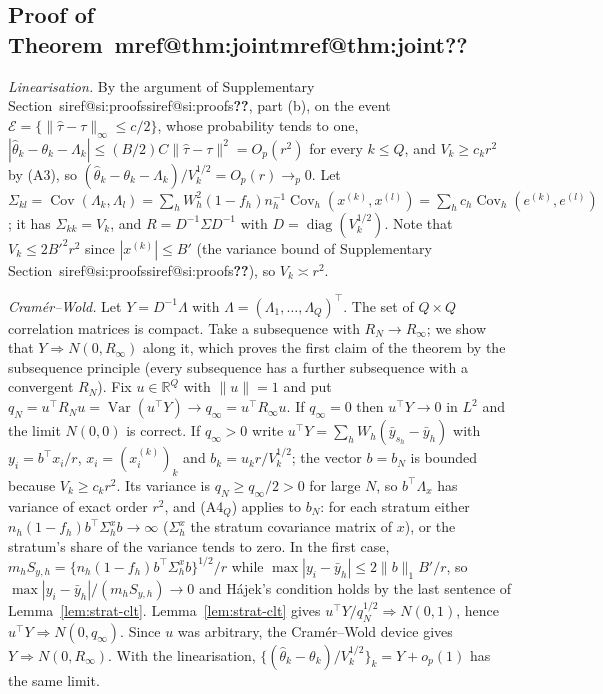 \documentclass[pdflatex,sn-mathphys-num,iicol]{sn-jnl}
\makeatletter
\theoremstyle{thmstyleone}
\theoremstyle{thmstyletwo}
\theoremstyle{thmstylethree}
\newcommand{\SIref}[1]{\ifcsname siref@#1\endcsname\csname siref@#1\endcsname\else\textbf{??}\fi}
\newcommand{\Mref}[1]{\ifcsname mref@#1\endcsname\csname mref@#1\endcsname\else\textbf{??}\fi}
\makeatother
\begin{document}
\subsection{Proof of Theorem~\Mref{thm:joint}}\label{si:testing-joint}

\emph{Linearisation.} By the argument of Supplementary Section~\SIref{si:proofs}, part (b), on the event $\mathcal E=\{\|\hat\tau-\tau\|_\infty\le c/2\}$, whose probability tends to one, $|\hat\theta_k-\theta_k-\Lambda_k|\le(B/2)C\|\hat\tau-\tau\|^2=O_p(r^2)$ for every $k\le Q$, and $V_k\ge c_kr^2$ by (A3), so $(\hat\theta_k-\theta_k-\Lambda_k)/V_k^{1/2}=O_p(r)\to_p0$. Let $\Sigma_{kl}=\operatorname{Cov}(\Lambda_k,\Lambda_l)=\sum_hW_h^2(1-f_h)n_h^{-1}\operatorname{Cov}_h(x^{(k)},x^{(l)})=\sum_hc_h\operatorname{Cov}_h(e^{(k)},e^{(l)})$; it has $\Sigma_{kk}=V_k$, and $R=D^{-1}\Sigma D^{-1}$ with $D=\operatorname{diag}(V_k^{1/2})$. Note that $V_k\le2B'^2r^2$ since $|x^{(k)}|\le B'$ (the variance bound of Supplementary Section~\SIref{si:proofs}), so $V_k\asymp r^2$.

\emph{Cram\'er--Wold.} Let $Y=D^{-1}\Lambda$ with $\Lambda=(\Lambda_1,\dots,\Lambda_Q)^\top$. The set of $Q\times Q$ correlation matrices is compact. Take a subsequence with $R_N\to R_\infty$; we show that $Y\Rightarrow N(0,R_\infty)$ along it, which proves the first claim of the theorem by the subsequence principle (every subsequence has a further subsequence with a convergent $R_N$). Fix $u\in\mathbb R^Q$ with $\|u\|=1$ and put $q_N=u^\top R_N u=\operatorname{Var}(u^\top Y)\to q_\infty=u^\top R_\infty u$. If $q_\infty=0$ then $u^\top Y\to0$ in $L^2$ and the limit $N(0,0)$ is correct. If $q_\infty>0$ write $u^\top Y=\sum_hW_h(\bar y_{s_h}-\bar y_h)$ with $y_i=b^\top x_i/r$, $x_i=(x^{(k)}_i)_k$ and $b_k=u_kr/V_k^{1/2}$; the vector $b=b_N$ is bounded because $V_k\ge c_kr^2$. Its variance is $q_N\ge q_\infty/2>0$ for large $N$, so $b^\top\Lambda_x$ has variance of exact order $r^2$, and (A4$_Q$) applies to $b_N$: for each stratum either $n_h(1-f_h)b^\top\Sigma^x_hb\to\infty$ ($\Sigma^x_h$ the stratum covariance matrix of $x$), or the stratum's share of the variance tends to zero. In the first case, $m_hS_{y,h}=\{n_h(1-f_h)b^\top\Sigma^x_hb\}^{1/2}/r$ while $\max|y_i-\bar y_h|\le2\|b\|_1B'/r$, so $\max|y_i-\bar y_h|/(m_hS_{y,h})\to0$ and Hájek's condition holds by the last sentence of Lemma~\ref{lem:strat-clt}. Lemma~\ref{lem:strat-clt} gives $u^\top Y/q_N^{1/2}\Rightarrow N(0,1)$, hence $u^\top Y\Rightarrow N(0,q_\infty)$. Since $u$ was arbitrary, the Cram\'er--Wold device gives $Y\Rightarrow N(0,R_\infty)$. With the linearisation, $\{(\hat\theta_k-\theta_k)/V_k^{1/2}\}_k=Y+o_p(1)$ has the same limit.
\end{document}
